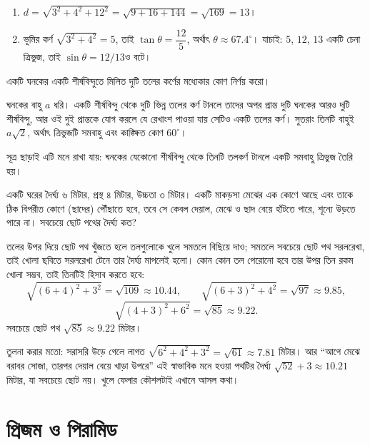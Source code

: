 \documentclass[11pt]{article}
\begin{document}
\begin{sol}
\begin{enumerate}
  \item $d = \sqrt{3^{2}+4^{2}+12^{2}} = \sqrt{9+16+144} = \sqrt{169} = 13$।
  \item ভূমির কর্ণ $\sqrt{3^{2}+4^{2}} = 5$, তাই
        $\tan\theta = \dfrac{12}{5}$, অর্থাৎ $\theta \approx 67.4^{\circ}$।
        যাচাই: $5$, $12$, $13$ একটি চেনা ত্রিভুজ, তাই
        $\sin\theta = 12/13$ও বটে।
\end{enumerate}
\end{sol}

 একটি ঘনকের একটি শীর্ষবিন্দুতে মিলিত দুটি তলের কর্ণের মধ্যেকার কোণ নির্ণয়
করো।

\begin{sol}
ঘনকের বাহু $a$ ধরি। একটি শীর্ষবিন্দু থেকে দুটি ভিন্ন তলের কর্ণ টানলে তাদের
অপর প্রান্ত দুটি ঘনকের আরও দুটি শীর্ষবিন্দু, আর ওই দুই প্রান্তকে যোগ করলে যে
রেখাংশ পাওয়া যায় সেটিও একটি তলের কর্ণ। সুতরাং তিনটি বাহুই $a\sqrt{2}$, অর্থাৎ
ত্রিভুজটি সমবাহু এবং কাঙ্ক্ষিত কোণ $60^{\circ}$।

সূত্র ছাড়াই এটি মনে রাখা যায়: ঘনকের যেকোনো শীর্ষবিন্দু থেকে তিনটি তলকর্ণ টানলে
একটি সমবাহু ত্রিভুজ তৈরি হয়।
\end{sol}

 একটি ঘরের দৈর্ঘ্য ৬ মিটার, প্রস্থ ৪ মিটার, উচ্চতা ৩ মিটার। একটি মাকড়সা
মেঝের এক কোণে আছে এবং তাকে ঠিক বিপরীত কোণে (ছাদের) পৌঁছাতে হবে, তবে সে কেবল
দেয়াল, মেঝে ও ছাদ বেয়ে হাঁটতে পারে, শূন্যে উড়তে পারে না। সবচেয়ে ছোট পথের
দৈর্ঘ্য কত?

\begin{sol}
তলের উপর দিয়ে ছোট পথ খুঁজতে হলে তলগুলোকে খুলে সমতলে বিছিয়ে দাও; সমতলে সবচেয়ে
ছোট পথ সরলরেখা, তাই খোলা ছবিতে সরলরেখা টেনে তার দৈর্ঘ্য মাপলেই হলো। কোন কোন তল
পেরোনো হবে তার উপর তিন রকম খোলা সম্ভব, তাই তিনটিই হিসাব করতে হবে:
\[
  \sqrt{(6+4)^{2}+3^{2}} = \sqrt{109} \approx 10.44, \qquad
  \sqrt{(6+3)^{2}+4^{2}} = \sqrt{97} \approx 9.85,
\]
\[
  \sqrt{(4+3)^{2}+6^{2}} = \sqrt{85} \approx 9.22 .
\]
সবচেয়ে ছোট পথ $\sqrt{85} \approx 9.22$ মিটার।

তুলনা করার মতো: সরাসরি উড়ে গেলে লাগত $\sqrt{6^{2}+4^{2}+3^{2}} = \sqrt{61}
\approx 7.81$ মিটার। আর ``আগে মেঝে বরাবর সোজা, তারপর দেয়াল বেয়ে খাড়া উপরে''
এই স্বাভাবিক মনে হওয়া পথটির দৈর্ঘ্য $\sqrt{52} + 3 \approx 10.21$ মিটার, যা
সবচেয়ে ছোট নয়। খুলে ফেলার কৌশলটাই এখানে আসল কথা।
\end{sol}

\section{প্রিজম ও পিরামিড}
\end{document}
